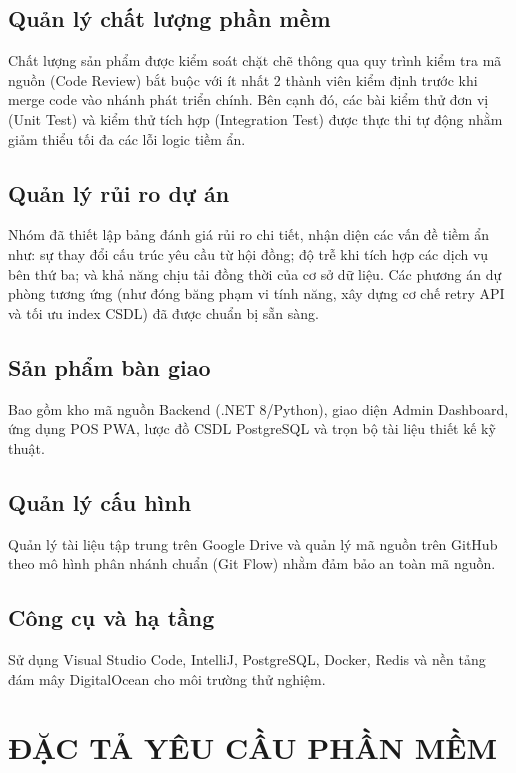 \documentclass[12pt,a4paper]{report}
\begin{document}
	\section{Quản lý chất lượng phần mềm}
	Chất lượng sản phẩm được kiểm soát chặt chẽ thông qua quy trình kiểm tra mã nguồn (Code Review) bắt buộc với ít nhất 2 thành viên kiểm định trước khi merge code vào nhánh phát triển chính. Bên cạnh đó, các bài kiểm thử đơn vị (Unit Test) và kiểm thử tích hợp (Integration Test) được thực thi tự động nhằm giảm thiểu tối đa các lỗi logic tiềm ẩn.
	
	\section{Quản lý rủi ro dự án}
	Nhóm đã thiết lập bảng đánh giá rủi ro chi tiết, nhận diện các vấn đề tiềm ẩn như: sự thay đổi cấu trúc yêu cầu từ hội đồng; độ trễ khi tích hợp các dịch vụ bên thứ ba; và khả năng chịu tải đồng thời của cơ sở dữ liệu. Các phương án dự phòng tương ứng (như đóng băng phạm vi tính năng, xây dựng cơ chế retry API và tối ưu index CSDL) đã được chuẩn bị sẵn sàng.
	
	\section{Sản phẩm bàn giao}
	Bao gồm kho mã nguồn Backend (.NET 8/Python), giao diện Admin Dashboard, ứng dụng POS PWA, lược đồ CSDL PostgreSQL và trọn bộ tài liệu thiết kế kỹ thuật.
	
	\section{Quản lý cấu hình}
	Quản lý tài liệu tập trung trên Google Drive và quản lý mã nguồn trên GitHub theo mô hình phân nhánh chuẩn (Git Flow) nhằm đảm bảo an toàn mã nguồn.
	
	\section{Công cụ và hạ tầng}
	Sử dụng Visual Studio Code, IntelliJ, PostgreSQL, Docker, Redis và nền tảng đám mây DigitalOcean cho môi trường thử nghiệm.
	
	\chapter{ĐẶC TẢ YÊU CẦU PHẦN MỀM}
\end{document}
